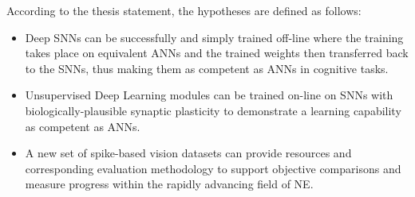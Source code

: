 According to the thesis statement, the hypotheses are defined as follows: 
\begin{itemize}
%

	\item 
	Deep SNNs can be successfully and simply trained off-line where the training takes place on equivalent ANNs and the trained weights then transferred back to the SNNs, thus making them as competent as ANNs in cognitive tasks.
	

	\item 
	Unsupervised Deep Learning modules can be trained on-line on SNNs with biologically-plausible synaptic plasticity to demonstrate a learning capability as competent as ANNs.


	\item 
	A new set of spike-based vision datasets can provide resources and corresponding evaluation methodology to support objective comparisons and measure progress within the rapidly advancing field of NE.

\end{itemize}


